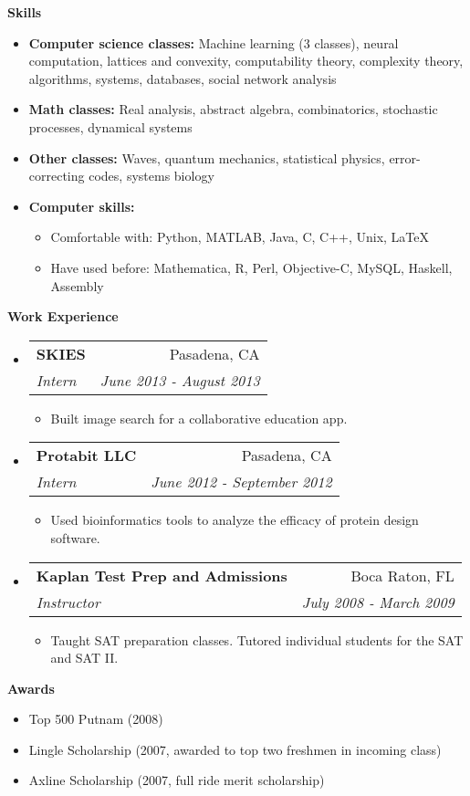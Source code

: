 \documentclass[letterpaper,11pt]{article}
\makeatletter
\newcommand{\resitem}[1]{\item #1 \vspace{-2pt}}
\newcommand{\resheading}[1]{{\large \colorbox{mygrey}{\begin{minipage}{\textwidth}{\textbf{#1 \vphantom{p\^{E}}}}\end{minipage}}}}
\newcommand{\ressubheading}[4]{
\begin{tabular*}{7.0in}{l@{\extracolsep{\fill}}r}
		\textbf{#1} & #2 \\
		\textit{#3} & \textit{#4} \\
\end{tabular*}\vspace{-6pt}}
\makeatother
\begin{document}
\resheading{Skills}
\begin{itemize}
\item \textbf{Computer science classes:} Machine learning (3 classes), neural computation, lattices and convexity, computability theory, complexity theory, algorithms, systems, databases, social network analysis
\item \textbf{Math classes:}  Real analysis, abstract algebra, combinatorics, stochastic processes, dynamical systems
\item \textbf{Other classes:} Waves, quantum mechanics, statistical physics, error-correcting codes, systems biology
\item \textbf{Computer skills:}
	\begin{itemize}
	\item Comfortable with: Python, MATLAB, Java, C, C++, Unix, LaTeX
	\item Have used before: Mathematica, R, Perl, Objective-C, MySQL, Haskell, Assembly
	\end{itemize}
\end{itemize}

\resheading{Work Experience}
\begin{itemize}
\item
	\ressubheading{SKIES}{Pasadena, CA}{Intern}{June 2013 - August 2013}
	\begin{itemize}
		\resitem{Built image search for a collaborative education app.}
	\end{itemize}
\item
	\ressubheading{Protabit LLC}{Pasadena, CA}{Intern}{June 2012 - September 2012}
	\begin{itemize}
		\resitem{Used bioinformatics tools to analyze the efficacy of protein design software.}
	\end{itemize}
\item
	\ressubheading{Kaplan Test Prep and Admissions}{Boca Raton, FL}{Instructor}{July 2008 - March 2009}
	\begin{itemize}
		\resitem{Taught SAT preparation classes.  Tutored individual students for the SAT and SAT II.}
	\end{itemize}
\end{itemize}

\resheading{Awards}
\begin{itemize}
	\item Top 500 Putnam (2008)
	\item Lingle Scholarship (2007, awarded to top two freshmen in incoming class)
	\item Axline Scholarship (2007, full ride merit scholarship)
\end{itemize}
\end{document}
